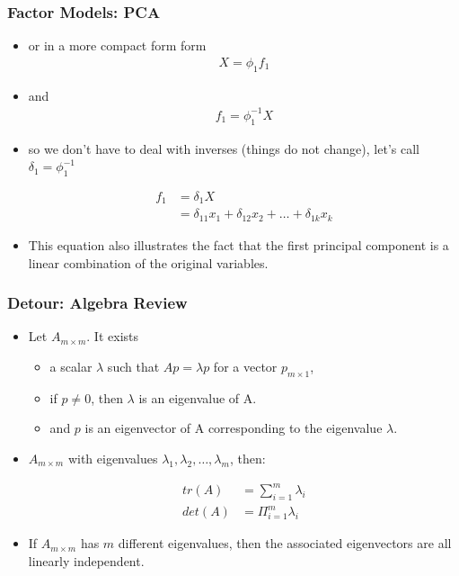 \documentclass[
  shownotes,
  xcolor={svgnames},
  hyperref={colorlinks,citecolor=DarkBlue,linkcolor=DarkRed,urlcolor=DarkBlue}
  , aspectratio=169]{beamer}
\begin{document}
\begin{frame}
\frametitle{Factor Models: PCA}

\begin{itemize}

\item or in a more compact form form
\begin{align}
X = \phi_1 f_1
\end{align}

\item and
\begin{align}
f_1 = \phi_1^{-1}X
\end{align}

\item so we don't have to deal with inverses (things do not change), let's call $\delta_1=\phi_1^{-1}$

\begin{align}
f_1 &= \delta_1 X \\
    &= \delta_{11} x_1+ \delta_{12} x_2 + \dots + \delta_{1k} x_k
\end{align}

\item This equation also illustrates the fact that the first principal component is a linear combination of the original variables. 
\end{itemize}


\end{frame}
\begin{frame}
\frametitle{Detour: Algebra Review}

\begin{itemize}

\item Let $A_{m\times m}$. It exists 
\begin{itemize}
  \item a scalar $\lambda$ such that $Ap = \lambda p$ for a vector $p_{m\times 1}$, 
  \item if $p \neq 0$, then $\lambda$ is an eigenvalue of A. 
  \item and $p$ is an eigenvector of A corresponding to the eigenvalue $\lambda$.
\end{itemize}

\item $A_{m\times m}$ with eigenvalues $\lambda_1, \lambda_2,\dots,\lambda_m$, then:

\begin{align}
tr(A) &= \sum_{i=1}^m \lambda_i \\
det(A) &= \Pi_{i=1}^m \lambda_i
\end{align}

\item If $A_{m\times m}$ has $m$ different eigenvalues, then the associated eigenvectors are all linearly independent.
\end{itemize}
\end{frame}
\end{document}
